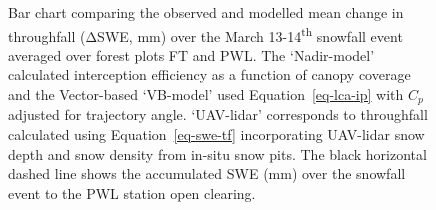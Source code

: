 \documentclass[
  letterpaper,
  DIV=11,
  numbers=noendperiod]{scrartcl}
\begin{document}
\begin{figure}[H]


\caption{\label{fig-event-tf}Bar chart comparing the observed and
modelled mean change in throughfall (ΔSWE, mm) over the March
13-14\textsuperscript{th} snowfall event averaged over forest plots FT
and PWL. The `Nadir-model' calculated interception efficiency as a
function of canopy coverage and the Vector-based `VB-model' used
Equation~\ref{eq-lca-ip} with \(C_p\) adjusted for trajectory angle.
`UAV-lidar' corresponds to throughfall calculated using
Equation~\ref{eq-swe-tf} incorporating UAV-lidar snow depth and snow
density from in-situ snow pits. The black horizontal dashed line shows
the accumulated SWE (mm) over the snowfall event to the PWL station open
clearing.}

\end{figure}%

\pagebreak
\end{document}
